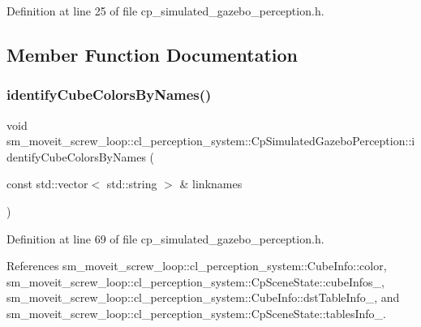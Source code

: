 Definition at line 25 of file cp\+\_\+simulated\+\_\+gazebo\+\_\+perception.\+h.



\subsection{Member Function Documentation}
\mbox{\label{classsm__moveit__screw__loop_1_1cl__perception__system_1_1CpSimulatedGazeboPerception_a3bc3d5a775d74573b93f8b585b89282c}} 
\subsubsection{\texorpdfstring{identify\+Cube\+Colors\+By\+Names()}{identifyCubeColorsByNames()}}
{\footnotesize\ttfamily void sm\+\_\+moveit\+\_\+screw\+\_\+loop\+::cl\+\_\+perception\+\_\+system\+::\+Cp\+Simulated\+Gazebo\+Perception\+::identify\+Cube\+Colors\+By\+Names (\begin{DoxyParamCaption}\item[{const std\+::vector$<$ std\+::string $>$ \&}]{linknames }\end{DoxyParamCaption})\hspace{0.3cm}{\ttfamily [inline]}}



Definition at line 69 of file cp\+\_\+simulated\+\_\+gazebo\+\_\+perception.\+h.



References sm\+\_\+moveit\+\_\+screw\+\_\+loop\+::cl\+\_\+perception\+\_\+system\+::\+Cube\+Info\+::color, sm\+\_\+moveit\+\_\+screw\+\_\+loop\+::cl\+\_\+perception\+\_\+system\+::\+Cp\+Scene\+State\+::cube\+Infos\+\_\+, sm\+\_\+moveit\+\_\+screw\+\_\+loop\+::cl\+\_\+perception\+\_\+system\+::\+Cube\+Info\+::dst\+Table\+Info\+\_\+, and sm\+\_\+moveit\+\_\+screw\+\_\+loop\+::cl\+\_\+perception\+\_\+system\+::\+Cp\+Scene\+State\+::tables\+Info\+\_\+.


